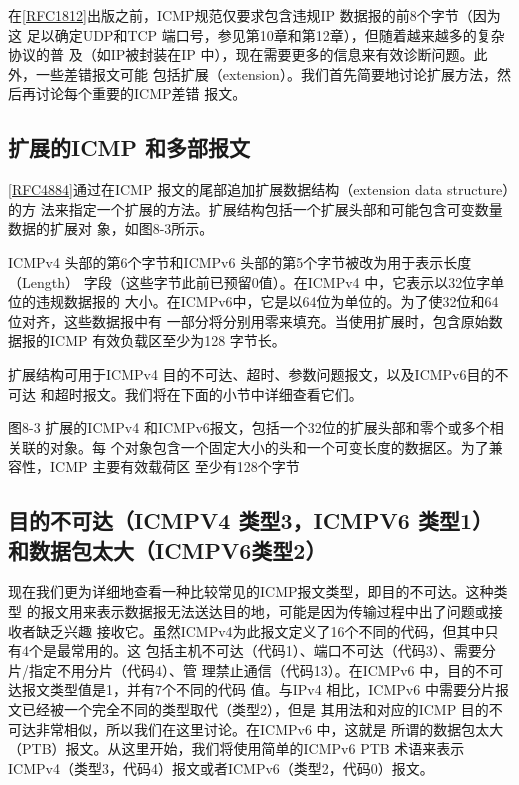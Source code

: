 在\href{https://www.rfc-editor.org/rfc/rfc1812}{[RFC1812]}出版之前，ICMP规范仅要求包含违规IP
数据报的前8个字节（因为这
足以确定UDP和TCP 端口号，参见第10章和第12章），但随着越来越多的复杂协议的普
及（如IP被封装在IP 中），现在需要更多的信息来有效诊断问题。此外，一些差错报文可能
包括扩展（extension）。我们首先简要地讨论扩展方法，然后再讨论每个重要的ICMP差错
报文。

\subsection{扩展的ICMP 和多部报文}
\href{https://www.rfc-editor.org/rfc/rfc4884}{[RFC4884]}通过在ICMP
报文的尾部追加扩展数据结构（extension data structure）的方
法来指定一个扩展的方法。扩展结构包括一个扩展头部和可能包含可变数量数据的扩展对
象，如图8-3所示。

ICMPv4 头部的第6个字节和ICMPv6 头部的第5个字节被改为用于表示长度（Length）
字段（这些字节此前已预留0值）。在ICMPv4 中，它表示以32位字单位的违规数据报的
大小。在ICMPv6中，它是以64位为单位的。为了使32位和64位对齐，这些数据报中有
一部分将分别用零来填充。当使用扩展时，包含原始数据报的ICMP 有效负载区至少为128
字节长。

扩展结构可用于ICMPv4 目的不可达、超时、参数问题报文，以及ICMPv6目的不可达
和超时报文。我们将在下面的小节中详细查看它们。

图8-3 扩展的ICMPv4 和ICMPv6报文，包括一个32位的扩展头部和零个或多个相关联的对象。每
个对象包含一个固定大小的头和一个可变长度的数据区。为了兼容性，ICMP 主要有效载荷区
至少有128个字节

\subsection{目的不可达（ICMPV4 类型3，ICMPV6 类型1）和数据包太大（ICMPV6类型2）}

现在我们更为详细地查看一种比较常见的ICMP报文类型，即目的不可达。这种类型
的报文用来表示数据报无法送达目的地，可能是因为传输过程中出了问题或接收者缺乏兴趣
接收它。虽然ICMPv4为此报文定义了16个不同的代码，但其中只有4个是最常用的。这
包括主机不可达（代码1）、端口不可达（代码3）、需要分片/指定不用分片（代码4）、管
理禁止通信（代码13）。在ICMPv6 中，目的不可达报文类型值是1，并有7个不同的代码
值。与IPv4 相比，ICMPv6 中需要分片报文已经被一个完全不同的类型取代（类型2），但是
其用法和对应的ICMP 目的不可达非常相似，所以我们在这里讨论。在ICMPv6 中，这就是
所谓的数据包太大（PTB）报文。从这里开始，我们将使用简单的ICMPv6 PTB 术语来表示
ICMPv4（类型3，代码4）报文或者ICMPv6（类型2，代码0）报文。

